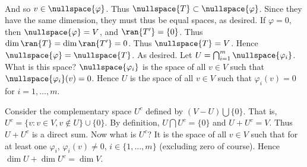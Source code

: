 \documentclass{book}
\begin{document}
\begin{enumerate}[label=\arabic*)]
\begin{align*}
      \end{align*}
      And so $v \in \nullspace{\varphi}$. Thus $\nullspace{T} \subset \nullspace{\varphi}$. Since they have the same dimension, they must thus be equal spaces, as desired. If $\varphi = 0$, then
      $\nullspace{\varphi} = V$, and $\ran{T^{\prime}} = \{0\}$. Thus $\dim{\ran{T}} = \dim{\ran{T^{\prime}}} = 0$. Thus $\nullspace{T} = V$. Hence $\nullspace{\varphi} =
      \nullspace{T}$. As desired.
    \ii
      Let $U = \bigcap_{i = 1}^{m}\nullspace{\varphi_i}$. What is this space? $\nullspace{\varphi_i}$ is the space of all $v \in V$ such that $\nullspace{\varphi_i}(v)
      = 0$. Hence $U$ is the space of all $v \in V$ such that $\varphi_i(v) = 0$ for $i = 1, \dots, m$. 

      Consider the complementary space $U^c$ defined by $(V - U)\bigcup\{0\}$. That is, $U^c = \{v: v \in V, v\not\in U\}\cup\{0\}$. By definition, $U\bigcap U^c = \{0\}$ and $U + U^c = V$.
      Thus $U + U^c$ is a direct sum. Now what is $U^c$? It is the space of all $v \in V$ such that for at least one $\varphi_i$, $\varphi_i(v) \neq 0$, $i \in \{1, \dots, m\}$ (excluding
      zero of course). Hence $\dim{U} + \dim{U^c} = \dim{V}$. 


\end{enumerate}
\end{document}
